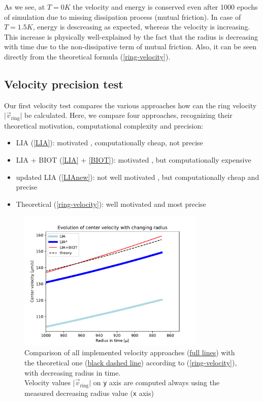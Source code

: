 As we see, at $T=0\unit{K}$ the velocity and energy is conserved even after 1000 epochs of simulation due to missing dissipation process (mutual friction). In case of $T=1.5\unit{K}$, energy is descreasing as expected, whereas the velocity is increasing. This increase is physically well-explained by the fact that the radius is decreasing with time due to the non-dissipative term of mutual friction. Also, it can be seen directly from the theoretical formula (\ref{ring-velocity}).


\subsection{Velocity precision test}

Our first velocity test compares the various approaches how can the ring velocity $\vert \vec{v}_{\text{ring}} \vert $ be calculated. Here, we compare four approaches, recognizing their theoretical motivation, computational complexity and precision:
\begin{itemize}
	\item LIA (\ref{LIA}): motivated \cite{barenghi}, computationally cheap, not precise
	\item LIA + BIOT (\ref{LIA} + \ref{BIOT}): motivated \cite{barenghi}, but computationally expensive
	\item updated LIA (\ref{LIAnew}): not well motivated \cite{samuels}, but computationally cheap and precise
	\item Theoretical (\ref{ring-velocity}): well motivated \cite{roberts} and most precise
\end{itemize}

\begin{figure}[h]
	\centering
	\includegraphics[width=0.8\textwidth]{graphics/results/vels_radius}
	\caption{Comparison of all implemented velocity approaches (\underline{full lines}) with the theoretical one (\underline{black dashed line}) according to (\ref{ring-velocity}), with decreasing radius in time.\\
	Velocity values $\vert \vec{v}_{\text{ring}} \vert$ on \texttt{y} axis are computed always using the measured decreasing radius value (\texttt{x} axis)}
	\label{vels-radius}
\end{figure}

